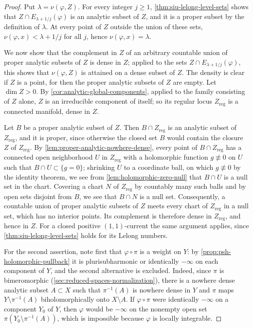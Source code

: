 \begin{proof}
Put $\lambda=\nu(\varphi,Z)$. For every integer $j\geq1$, \cref{thm:siu-lelong-level-sets} shows that $Z\cap E_{\lambda+1/j}(\varphi)$ is an analytic subset of $Z$, and it is a proper subset by the definition of $\lambda$. At every point of $Z$ outside the union of these sets, $\nu(\varphi,x)<\lambda+1/j$ for all $j$, hence $\nu(\varphi,x)=\lambda$.

We now show that the complement in $Z$ of an arbitrary countable union of proper analytic subsets of $Z$ is dense in $Z$; applied to the sets $Z\cap E_{\lambda+1/j}(\varphi)$, this shows that $\nu(\varphi,Z)$ is attained on a dense subset of $Z$. The density is clear if $Z$ is a point, for then the proper analytic subsets of $Z$ are empty. Let $\dim Z>0$. By \cref{cor:analytic-global-components}, applied to the family consisting of $Z$ alone, $Z$ is an irreducible component of itself; so its regular locus $Z_{\mathrm{reg}}$ is a connected manifold, dense in $Z$.

Let $B$ be a proper analytic subset of $Z$. Then $B\cap Z_{\mathrm{reg}}$ is an analytic subset of $Z_{\mathrm{reg}}$, and it is proper, since otherwise the closed set $B$ would contain the closure $Z$ of $Z_{\mathrm{reg}}$. By \cref{lem:proper-analytic-nowhere-dense}, every point of $B\cap Z_{\mathrm{reg}}$ has a connected open neighborhood $U$ in $Z_{\mathrm{reg}}$ with a holomorphic function $g\not\equiv0$ on $U$ such that $B\cap U\subset\{g=0\}$; shrinking $U$ to a coordinate ball, on which $g\not\equiv0$ by the identity theorem, we see from \cref{lem:holomorphic-zero-null} that $B\cap U$ is a null set in the chart. Covering a chart $N$ of $Z_{\mathrm{reg}}$ by countably many such balls and by open sets disjoint from $B$, we see that $B\cap N$ is a null set. Consequently, a countable union of proper analytic subsets of $Z$ meets every chart of $Z_{\mathrm{reg}}$ in a null set, which has no interior points. Its complement is therefore dense in $Z_{\mathrm{reg}}$, and hence in $Z$. For a closed positive $(1,1)$-current the same argument applies, since \cref{thm:siu-lelong-level-sets} holds for its Lelong numbers.

For the second assertion, note first that $\varphi\circ\pi$ is a weight on $Y$: by \cref{prop:psh-holomorphic-pullback} it is plurisubharmonic or identically $-\infty$ on each component of $Y$, and the second alternative is excluded. Indeed, since $\pi$ is bimeromorphic (\cref{sec:reduced-spaces-normalization}), there is a nowhere dense analytic subset $A\subset X$ such that $\pi^{-1}(A)$ is nowhere dense in $Y$ and $\pi$ maps $Y\setminus\pi^{-1}(A)$ biholomorphically onto $X\setminus A$. If $\varphi\circ\pi$ were identically $-\infty$ on a component $Y_0$ of $Y$, then $\varphi$ would be $-\infty$ on the nonempty open set $\pi(Y_0\setminus\pi^{-1}(A))$, which is impossible because $\varphi$ is locally integrable.


\end{proof}
